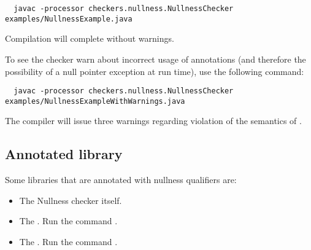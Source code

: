 \begin{Verbatim}
  javac -processor checkers.nullness.NullnessChecker examples/NullnessExample.java
\end{Verbatim}

\noindent
Compilation will complete without warnings.

To see the checker warn about incorrect usage of annotations (and therefore the
possibility of a null pointer exception at run time), use the following command:

\begin{Verbatim}
  javac -processor checkers.nullness.NullnessChecker examples/NullnessExampleWithWarnings.java
\end{Verbatim}

\noindent
The compiler will issue three warnings regarding violation of the semantics of
.


\subsection{Annotated library\label{nullness-annotated-library}}

Some libraries that are annotated with nullness qualifiers are:

\begin{itemize}
\item
The Nullness checker itself.

\item
The
.
Run the command .


\item
The
.
Run the command .

%
%
%

\end{itemize}


